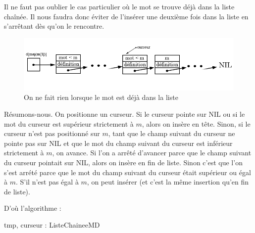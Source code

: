 \documentclass[a4paper, titlepage]{livret} %
\begin{document}
					Il ne faut pas oublier le cas particulier où le mot se trouve déjà dans la liste chaînée.
					Il nous faudra donc éviter de l'insérer une deuxième fois dans la liste en s'arrêtant dès qu'on le rencontre.
					\begin{figure}[!ht]
					\centering
  						\includegraphics[scale=0.45]{inserer4.png}
  						\caption{On ne fait rien lorsque le mot est déjà dans la liste} 
					\end{figure}
				
					Résumons-nous.
					On positionne un curseur.
					Si le curseur pointe sur NIL ou si le mot du curseur est supérieur strictement à $m$, alors on insère en tête.
					Sinon, si le curseur n'est pas positionné sur $m$, tant que le champ suivant du curseur ne pointe pas sur NIL et que le mot du champ suivant du curseur est inférieur strictement à $m$, on avance.
					Si l'on a arrêté d'avancer parce que le champ suivant du curseur pointait sur NIL, alors on insère en fin de liste.
					Sinon c'est que l'on s'est arrété parce que le mot du champ suivant du curseur était supérieur ou égal à $m$.
					S'il n'est pas égal à $m$, on peut insérer (et c'est la même insertion qu'en fin de liste).

					D'où l'algorithme : \\
					\begin{algorithme}
						{tmp, curseur : ListeChaineeMD}{
						}
					\end{algorithme}
\end{document}
